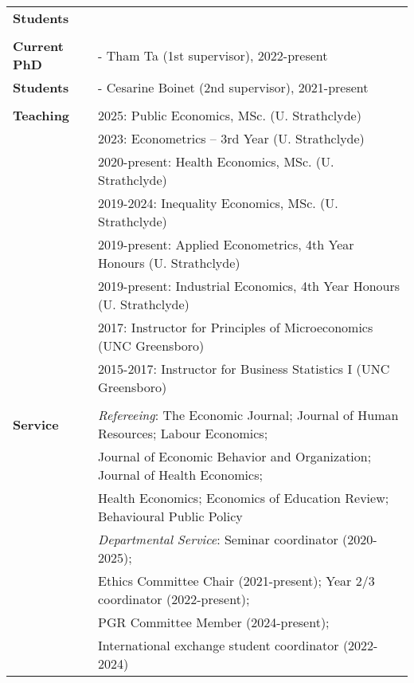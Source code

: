 \documentclass[11pt,a4paper]{article}
\begin{document}
\begin{longtable}{l l}
\textbf{Students}                                      &  \\
																												&  \\
\textbf{Current PhD}     											          & - Tham Ta (1st supervisor), 2022-present \\
\textbf{Students}																			  & - Cesarine Boinet (2nd supervisor), 2021-present  \\	
																												& \\
\textbf{Teaching}																		&  2025: Public Economics, MSc. (U. Strathclyde)  \\		
																						&  2023: Econometrics -- 3rd Year (U. Strathclyde)  \\
																												&  2020-present: Health Economics, MSc. (U. Strathclyde)  \\  							
																												&  2019-2024: Inequality Economics, MSc. (U. Strathclyde)	   \\
																												&  2019-present: Applied Econometrics, 4th Year Honours (U. Strathclyde)  \\
																												&  2019-present: Industrial Economics, 4th Year Honours (U. Strathclyde)  \\
																												&  2017: Instructor for Principles of Microeconomics  (UNC Greensboro)  \\
																												&  2015-2017: Instructor for Business Statistics I  (UNC Greensboro)   \\
																												&  \\
\textbf{Service}							 								&  \textit{Refereeing}: The Economic Journal; Journal of Human Resources; Labour Economics;  \\ 
																												& Journal of Economic Behavior and Organization; Journal of Health Economics; \\
																												& Health Economics; Economics of Education Review; Behavioural Public Policy  \\
\addlinespace
																												&  \textit{Departmental Service}: Seminar coordinator (2020-2025);  \\
																												&  Ethics Committee Chair (2021-present); Year 2/3 coordinator (2022-present);  \\ 	
																												& PGR Committee Member (2024-present); \\
																												& 	 International exchange student coordinator (2022-2024)  \\																				
\end{longtable}
\end{document}
